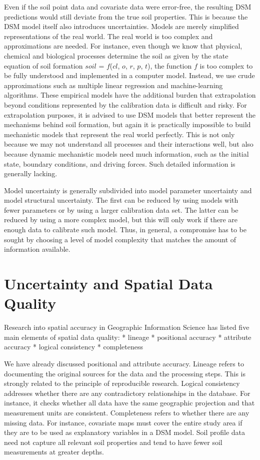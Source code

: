 \documentclass[10pt,b5paper,]{book}
\theoremstyle{definition}
\theoremstyle{definition}
\theoremstyle{definition}
\theoremstyle{remark}
\begin{document}
Even if the soil point data and covariate data were error-free, the
resulting DSM predictions would still deviate from the true soil
properties. This is because the DSM model itself also introduces
uncertainties. Models are merely simplified representations of the real
world. The real world is too complex and approximations are needed. For
instance, even though we know that physical, chemical and biological
processes determine the soil as given by the state equation of soil
formation \(soil\) = \(f\)(\(cl\), \(o\), \(r\), \(p\), \(t\)), the
function \(f\) is too complex to be fully understood and implemented in
a computer model. Instead, we use crude approximations such as multiple
linear regression and machine-learning algorithms. These empirical
models have the additional burden that extrapolation beyond conditions
represented by the calibration data is difficult and risky. For
extrapolation purposes, it is advised to use DSM models that better
represent the mechanisms behind soil formation, but again it is
practically impossible to build mechanistic models that represent the
real world perfectly. This is not only because we may not understand all
processes and their interactions well, but also because dynamic
mechanistic models need much information, such as the initial state,
boundary conditions, and driving forces. Such detailed information is
generally lacking.

Model uncertainty is generally subdivided into model parameter
uncertainty and model structural uncertainty. The first can be reduced
by using models with fewer parameters or by using a larger calibration
data set. The latter can be reduced by using a more complex model, but
this will only work if there are enough data to calibrate such model.
Thus, in general, a compromise has to be sought by choosing a level of
model complexity that matches the amount of information available.

\hypertarget{uncertainty-and-spatial-data-quality}{%
\section{Uncertainty and Spatial Data
Quality}\label{uncertainty-and-spatial-data-quality}}

Research into spatial accuracy in Geographic Information Science has
listed five main elements of spatial data quality: * lineage *
positional accuracy * attribute accuracy * logical consistency *
completeness

We have already discussed positional and attribute accuracy. Lineage
refers to documenting the original sources for the data and the
processing steps. This is strongly related to the principle of
reproducible research. Logical consistency addresses whether there are
any contradictory relationships in the database. For instance, it checks
whether all data have the same geographic projection and that
measurement units are consistent. Completeness refers to whether there
are any missing data. For instance, covariate maps must cover the entire
study area if they are to be used as explanatory variables in a DSM
model. Soil profile data need not capture all relevant soil properties
and tend to have fewer soil measurements at greater depths.
\end{document}
